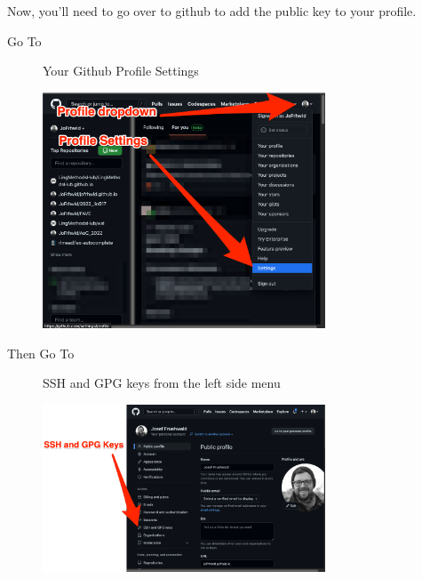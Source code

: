 \documentclass[
  letterpaper,
  DIV=11,
  numbers=noendperiod]{scrartcl}
\begin{document}
Now, you'll need to go over to github to add the public key to your
profile.

\begin{tcolorbox}[enhanced jigsaw, leftrule=.75mm, colback=white, left=2mm, bottomrule=.15mm, rightrule=.15mm, breakable, arc=.35mm, opacityback=0, colframe=quarto-callout-tip-color-frame, toprule=.15mm]

\textbf{}\vspace{2mm}

\begin{description}
\item[Go To]
Your Github Profile Settings
\end{description}

\begin{figure}[H]

{\centering \includegraphics[width=0.75\textwidth,height=\textheight]{github_onboarding_assets/github_settings.png}

}

\end{figure}

\begin{description}
\item[Then Go To]
SSH and GPG keys from the left side menu
\end{description}

\begin{figure}[H]

{\centering \includegraphics[width=0.75\textwidth,height=\textheight]{github_onboarding_assets/ssh_gpg.png}

}
\end{figure}
\end{tcolorbox}
\end{document}
